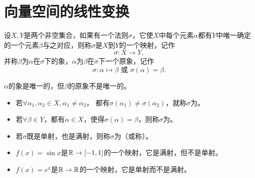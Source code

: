 \section{向量空间的线性变换}

\begin{frame}
  \begin{dingyi}[映射]
    设$X,Y$是两个非空集合，如果有一个法则$\sigma$，它使$X$中每个元素$\alpha$都有$Y$中唯一确定的一个元素$\beta$与之对应，则称$\sigma$是$X$到$Y$的一个映射，记作
    $$
    \sigma: X \to Y,
    $$
    并称$\beta$为$\alpha$在$\sigma$下的象，$\alpha$为$\beta$在$\sigma$下一个原象，记作
    $$
    \sigma: \alpha \mapsto \beta \mbox{ 或 } \sigma(\alpha)=\beta.
    $$    
  \end{dingyi} \vspace{.1in} \pause 

  \begin{zhu}
    $\alpha$的象是唯一的，但$\beta$的原象不是唯一的。
  \end{zhu}\vspace{.1in} \pause 

\end{frame}

\begin{frame}
  \begin{itemize}
    \item 若$\forall \alpha_1,\alpha_2\in X, \alpha_1\ne \alpha_2$，
      都有$\sigma(\alpha_1)\ne \sigma(\alpha_2)$，就称$\sigma$为。\\[0.15in]
    \item 若$\forall \beta\in Y$，都有$\alpha \in X$，使得$\sigma(\alpha)=\beta$，则称$\sigma$为。\\[0.15in]
    \item 若$\sigma$既是单射，也是满射，则称$\sigma$为（或称）。
  \end{itemize}
\end{frame}

\begin{frame}
  \begin{li}
    \begin{itemize}
    \item $f(x)=\sin x$是$\mathbb R \to [-1,1]$的一个映射，它是满射，但不是单射。\\[0.1in]
    \item $f(x)=e^x$是$\mathbb R \to \mathbb R$的一个映射，它是单射而不是满射。
    \end{itemize}
  \end{li}
\end{frame}


